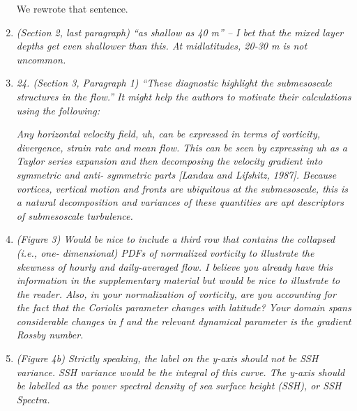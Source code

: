 \documentclass[11pt]{article}
\begin{document}
\begin{enumerate}
      We rewrote that sentence.

\item {\it (Section 2, last paragraph) ``as shallow as 40 m'' – I bet that the mixed layer depths get
      even shallower than this. At midlatitudes, 20-30 m is not uncommon.}

\item {\it 24. (Section 3, Paragraph 1) ``These diagnostic highlight the submesoscale structures in
      the flow.'' It might help the authors to motivate their calculations using the following:}\\

\begin{description}
      {\it Any horizontal velocity field, uh, can be expressed in terms of vorticity, divergence,
      strain rate and mean flow. This can be seen by expressing uh as a Taylor series
      expansion and then decomposing the velocity gradient into symmetric and anti-
      symmetric parts [Landau and Lifshitz, 1987]. Because vortices, vertical motion and
      fronts are ubiquitous at the submesoscale, this is a natural decomposition and
      variances of these quantities are apt descriptors of submesoscale turbulence.}
\end{description}

\item {\it (Figure 3) Would be nice to include a third row that contains the collapsed (i.e., one-
      dimensional) PDFs of normalized vorticity to illustrate the skewness of hourly and
      daily-averaged flow. I believe you already have this information in the supplementary
      material but would be nice to illustrate to the reader. Also, in your normalization of
      vorticity, are you accounting for the fact that the Coriolis parameter changes with
      latitude? Your domain spans considerable changes in f and the relevant dynamical
      parameter is the gradient Rossby number.}

\item {\it (Figure 4b) Strictly speaking, the label on the y-axis should not be SSH variance. SSH
      variance would be the integral of this curve. The y-axis should be labelled as the
      power spectral density of sea surface height (SSH), or SSH Spectra.}\\


\end{enumerate}
\end{document}
